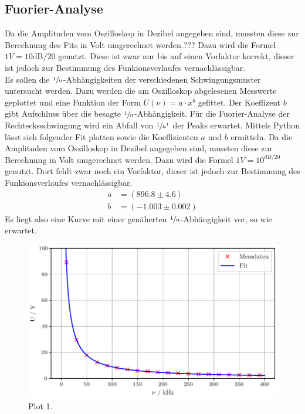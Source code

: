 \subsection{Fuorier-Analyse}
Da die Amplituden vom Oszilloskop in Dezibel angegeben sind, mussten diese zur Berechnung des Fits in Volt umgerechnet werden.???
Dazu wird die Formel $1V=10{\text{dB}/20}$ genutzt. Diese ist zwar nur bis auf einen Vorfaktor korrekt, dieser ist jedoch zur Bestimmung
des Funkionsverlaufes vernachlässigbar.\\
Es sollen die $\sfrac{1}{n}$-Abhängigkeiten der verschiedenen Schwingungsmuster untersucht werden. Dazu werden die am Oszilloskop 
abgelesenen Messwerte geplottet und eine Funktion der Form $U(\nu)=a\cdot x^b$ gefittet. Der Koeffizent $b$ gibt Aufschluss über die 
besagte $\sfrac{1}{n}$-Abhängigkeit. Für die Fuorier-Analyse der Rechtecksschwingung wird ein Abfall von $\sfrac{1}{n^1}$ der Peaks
erwartet.
Mittels Python lässt sich folgender Fit plotten sowie die Koeffizienten $a$ und $b$ ermitteln.
Da die Amplituden vom Oszilloskop in Dezibel angegeben sind, mussten diese zur Berechnung in Volt umgerechnet werden.
Dazu wird die Formel $1V=10^{\si{dB}/20}$ genutzt. Dort fehlt zwar noch ein Vorfaktor, dieser ist jedoch zur Bestimmung
des Funkionsverlaufes vernachlässigbar. 
\begin{align*}
  a &= (896.8 ± 4.6)\\
  b &= (-1.003 ± 0.002)
\end{align*}
Es liegt also eine Kurve mit einer genäherten $\sfrac{1}{n}$-Abhängigkeit vor, so wie erwartet.
\begin{figure}[H]
  \centering
  \includegraphics[scale=0.6]{plota.pdf}
  \caption{Plot 1.}
  \label{fig:Plot1}
\end{figure}\noindent
